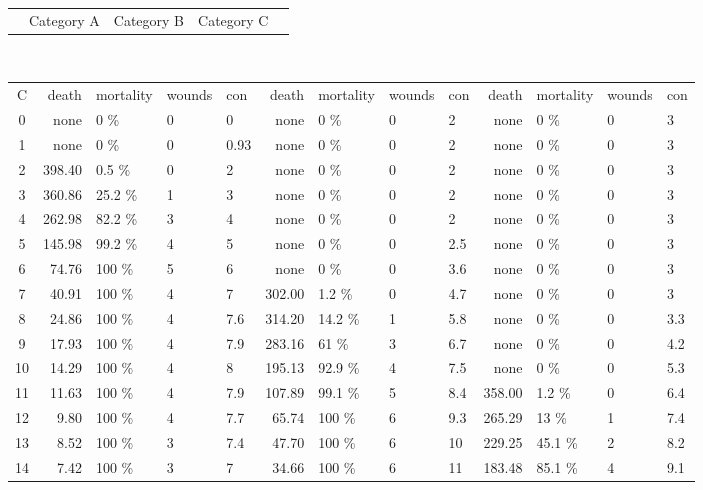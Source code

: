 \documentclass{article}
\begin{document}
    \begin{tabular*}{\textwidth}{c@{\extracolsep{\fill}}lcrc}
        &Category A & Category B & Category C&\\
    \end{tabular*}\\
     \begin{tabular}{c|rlll|rlll|rlll}
C & death & mortality & wounds & con & death & mortality & wounds & con &death & mortality & wounds & con\\
0  &none   	&0    \% &     0 &     0 &none   	&0    \% &     0 &     2 &none   	&0    \% &     0 &     3\\
1  &none   	&0    \% &     0 &  0.93 &none   	&0    \% &     0 &     2 &none   	&0    \% &     0 &     3\\
2  &398.40 	&0.5  \% &     0 &     2 &none   	&0    \% &     0 &     2 &none   	&0    \% &     0 &     3\\
3  &360.86 	&25.2 \% &     1 &     3 &none   	&0    \% &     0 &     2 &none   	&0    \% &     0 &     3\\
4  &262.98 	&82.2 \% &     3 &     4 &none   	&0    \% &     0 &     2 &none   	&0    \% &     0 &     3\\
5  &145.98 	&99.2 \% &     4 &     5 &none   	&0    \% &     0 &   2.5 &none   	&0    \% &     0 &     3\\
6  & 74.76 	&100  \% &     5 &     6 &none   	&0    \% &     0 &   3.6 &none   	&0    \% &     0 &     3\\
7  & 40.91 	&100  \% &     4 &     7 &302.00 	&1.2  \% &     0 &   4.7 &none   	&0    \% &     0 &     3\\
8  & 24.86 	&100  \% &     4 &   7.6 &314.20 	&14.2 \% &     1 &   5.8 &none   	&0    \% &     0 &   3.3\\
9  & 17.93 	&100  \% &     4 &   7.9 &283.16 	&61   \% &     3 &   6.7 &none   	&0    \% &     0 &   4.2\\
10 & 14.29 	&100  \% &     4 &     8 &195.13 	&92.9 \% &     4 &   7.5 &none   	&0    \% &     0 &   5.3\\
11 & 11.63 	&100  \% &     4 &   7.9 &107.89 	&99.1 \% &     5 &   8.4 &358.00 	&1.2  \% &     0 &   6.4\\
12 &  9.80 	&100  \% &     4 &   7.7 & 65.74 	&100  \% &     6 &   9.3 &265.29 	&13   \% &     1 &   7.4\\
13 &  8.52 	&100  \% &     3 &   7.4 & 47.70 	&100  \% &     6 &    10 &229.25 	&45.1 \% &     2 &   8.2\\
14 &  7.42 	&100  \% &     3 &     7 & 34.66 	&100  \% &     6 &    11 &183.48 	&85.1 \% &     4 &   9.1\\

\end{tabular}
\end{document}
